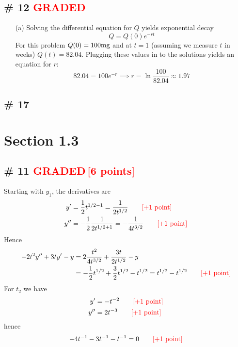 \documentclass[12pt,letterpaper]{exam}
\newcommand{\grade}{\textcolor{red}{GRADED}}
\newcommand{\pts}[1]{\textcolor{red}{[#1]}}
\begin{document}
\subsection*{\# 12 \grade}
\begin{enumerate}
\item[(a)] Solving the differential equation for $Q$ yields exponential decay
\begin{equation}
Q = Q(0)e^{-rt}
\end{equation}
For this problem $Q(0) = 100{\rm mg}$ and at $t=1$ (assuming we measure $t$ in weeks) $Q(t) = 82.04$. Plugging these values in to the solutions yields an equation for $r$: 
\begin{equation*}
82.04 = 100 e^{-r} \implies r =  \ln \frac{100}{82.04} \approx 1.97
\end{equation*}
\end{enumerate}


\subsection*{\# 17}


\section*{Section 1.3}

\subsection*{\# 11 \grade \,\pts{6 points}}
Starting with $y_1$, the derivatives are
\begin{align}
y' &= \frac{1}{2}t^{1/2-1} = \frac{1}{2t^{1/2}} \quad\quad \text{\pts{+1 point}}\\
y'' &= -\frac{1}{2} \frac{1}{2t^{1/2+1}} = -\frac{1}{4t^{3/2}} \quad\quad \text{\pts{+1 point}}
\end{align}
Hence 
\begin{align}
-2t^2y'' + 3ty' - y &= 2\frac{t^2}{4t^{3/2}}  +\frac{3t}{2t^{1/2}} - y\\
&= -\frac{1}{2}t^{1/2} + \frac{3}{2}t^{1/2} - t^{1/2} = t^{1/2} - t^{1/2} \quad\quad \text{\pts{+1 point}}
\end{align}
For $t_2$ we have
\begin{align}
y' &=-t^{-2}  \quad\quad \text{\pts{+1 point}}\\
y'' &= 2 t^{-3} \quad\quad \text{\pts{+1 point}}
\end{align}
hence 
\begin{align}
-4t^{-1} - 3t^{-1}- t^{-1} = 0  \quad\quad \text{\pts{+1 point}}
\end{align}
\end{document}
